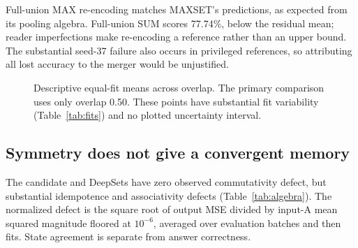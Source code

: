 \documentclass[10pt]{article}
\begin{document}
Full-union MAX re-encoding matches MAXSET's predictions, as expected from its
pooling algebra. Full-union SUM scores 77.74\%, below the residual mean;
reader imperfections make re-encoding a reference rather than an upper bound.
The substantial seed-37 failure also occurs in privileged references, so
attributing all lost accuracy to the merger would be unjustified.

\begin{figure}[ht]
\centering
{}
\caption{Descriptive equal-fit means across overlap. The primary comparison
uses only overlap 0.50. These points have substantial fit variability
(Table~\ref{tab:fits}) and no plotted uncertainty interval.}
\label{fig:overlap}
\end{figure}

\subsection{Symmetry does not give a convergent memory}
The candidate and DeepSets have zero observed commutativity defect, but
substantial idempotence and associativity defects (Table~\ref{tab:algebra}).
The normalized defect is the square root of output MSE divided by input-A
mean squared magnitude floored at $10^{-6}$, averaged over evaluation batches
and then fits. State agreement is separate from answer correctness.
\end{document}
